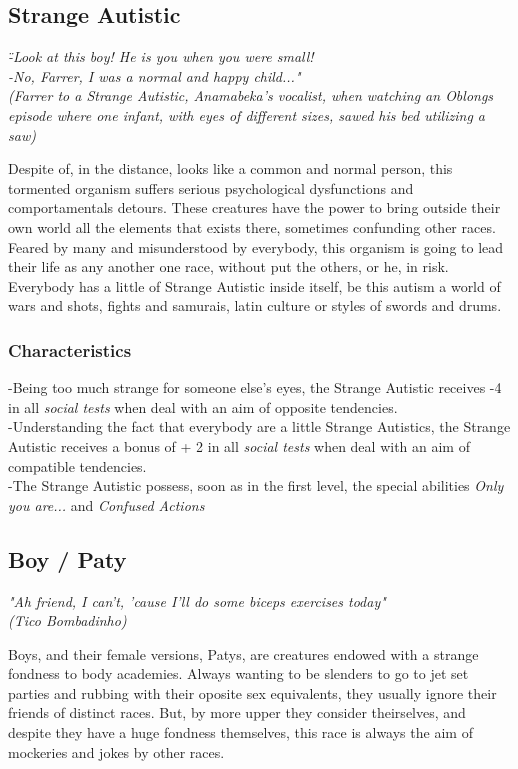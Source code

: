 \documentclass[ letterpaper,12pt]{article}
\begin{document}
\subsection{Strange Autistic}
{\it \" -Look at this boy! He is you when you were small!\\
 -No, Farrer, I was a normal and happy child..."\\
(Farrer to a Strange Autistic, Anamabeka's vocalist, when watching an Oblongs episode where one infant, with eyes of different sizes, sawed his bed utilizing a saw)\\}

Despite of, in the distance, looks like a common and normal person, this
tormented organism suffers serious psychological dysfunctions and
comportamentals detours. These creatures have the power to bring outside their
own world all the elements that exists there, sometimes confunding other races.
Feared by many and misunderstood by everybody, this organism is going to lead
their life as any another one race, without put the others, or he, in risk.
Everybody has a little of Strange Autistic inside itself, be this autism a
world of wars and shots, fights and samurais, latin culture or styles of swords
and drums.

\subsubsection{Characteristics}
-Being too much strange for someone else's eyes, the Strange Autistic receives -4 in all {\it social tests} when deal with an aim of opposite tendencies. \\
-Understanding the fact that everybody are a little Strange Autistics, the Strange Autistic receives a bonus of + 2 in all {\it social tests} when deal with an aim of compatible tendencies.\\
-The Strange Autistic possess, soon as in the first level, the special abilities {\it Only you are...} and {\it Confused Actions}\\

\subsection{Boy / Paty}
{\it "Ah friend, I can't, 'cause I'll do some biceps exercises today"\\
(Tico Bombadinho)\\}

Boys, and their female versions, Patys, are creatures endowed with a strange fondness to body academies. Always wanting to be slenders to go to jet set parties and rubbing with their oposite sex equivalents, they usually ignore their friends of distinct races. But, by more upper they consider theirselves, and despite they have a huge fondness themselves, this race is always the aim of mockeries and jokes by other races.\\
\end{document}

